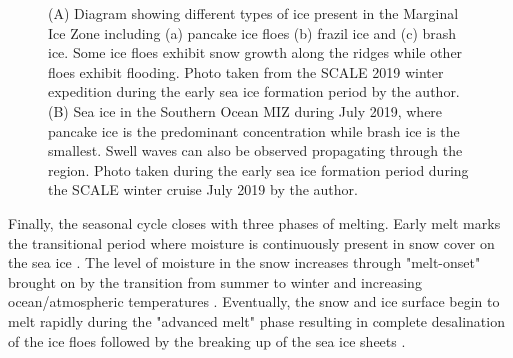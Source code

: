 \begin{figure}[H]
	\centering
	\begin{subfigure}[t]{0.5\textwidth}

	\label{fig:Ice Types}
	\end{subfigure}%
	\begin{subfigure}[t]{0.5\textwidth}
		\label{fig:MIZICE}
	\end{subfigure}%
	\caption{(A) Diagram showing different types of ice present in the Marginal Ice Zone including (a) pancake ice floes (b) frazil ice and (c) brash ice. Some ice floes exhibit snow growth along the ridges while other floes exhibit flooding. Photo taken from the SCALE 2019 winter expedition during the early sea ice formation period by the author. (B) Sea ice in the Southern Ocean MIZ during July 2019, where pancake ice is the predominant  concentration while brash ice is the smallest. Swell waves can also be observed propagating through the region. Photo taken during the early sea ice formation period during the SCALE winter cruise July 2019 by the author.}
	\label{fig:ridging}
\end{figure}


Finally, the seasonal cycle closes with three phases of melting. Early melt marks the transitional period  where moisture is continuously present in snow cover on the sea ice \cite{barber2005microwave}. The level of moisture in the snow increases through "melt-onset" brought on by the transition from summer to winter and increasing ocean/atmospheric temperatures \cite{barber2005microwave}. Eventually, the snow and ice surface begin to melt rapidly during the "advanced melt" phase resulting in complete desalination of the ice floes followed by the breaking up of the sea ice sheets \cite{barber2005microwave}. 

